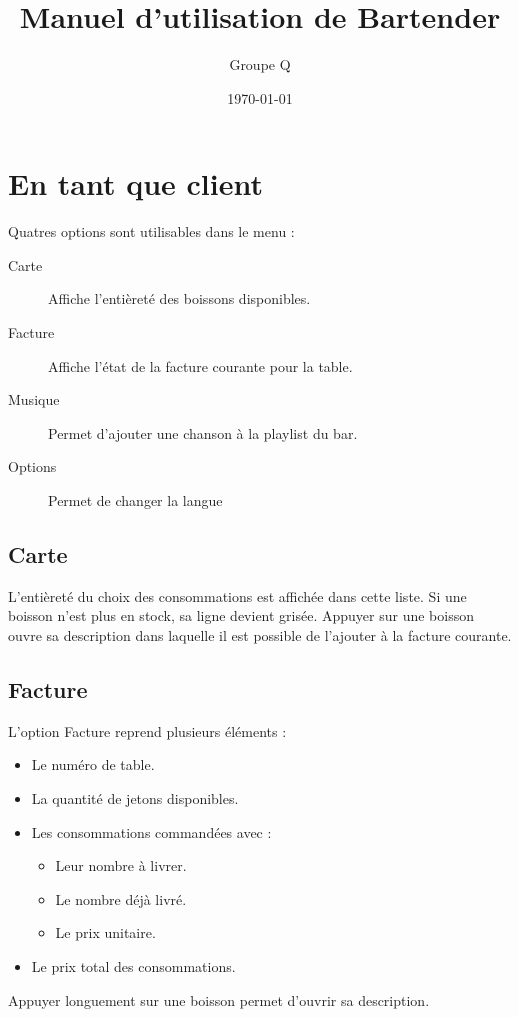 ﻿\documentclass[a4paper,11pt]{article}
\title{Manuel d'utilisation de Bartender}
\date{\today}
\author{Groupe Q}
\begin{document}
{\let\newpage\relax\maketitle}

\section{En tant que client}

Quatres options sont utilisables dans le menu :

\begin{description}
	\item[Carte] Affiche l'entièreté des boissons disponibles.
	\item[Facture] Affiche l'état de la facture courante pour la table.
	\item[Musique] Permet d'ajouter une chanson à la playlist du bar.
	\item[Options] Permet de changer la langue
\end{description}

\subsection{Carte}	
L'entièreté du choix des consommations est affichée dans cette liste. Si une boisson n'est plus en stock, sa ligne devient grisée. Appuyer sur une boisson ouvre sa description dans laquelle il est possible de l'ajouter à la facture courante.

\subsection{Facture}
L'option Facture reprend plusieurs éléments :
\begin{itemize}
	\item Le numéro de table.
	\item La quantité de jetons disponibles.
	\item Les consommations commandées avec :
	\begin{itemize}
		\item Leur nombre à livrer.
		\item Le nombre déjà livré.
		\item Le prix unitaire.
	\end{itemize}
	\item Le prix total des consommations.
\end{itemize}

Appuyer longuement sur une boisson permet d'ouvrir sa description.
\end{document}
